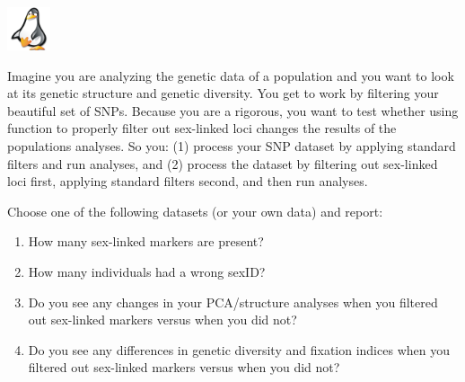 \documentclass[
  letterpaper,
  DIV=11,
  numbers=noendperiod]{scrreprt}
\let\textttOrig\texttt
\renewcommand{\texttt}[1]{\textttOrig{\color{blue}{#1}}}
\begin{document}

\begin{tcolorbox}[enhanced jigsaw, coltitle=black, colframe=quarto-callout-note-color-frame, colbacktitle=quarto-callout-note-color!10!white, breakable, bottomtitle=1mm, rightrule=.15mm, opacitybacktitle=0.6, left=2mm, arc=.35mm, opacityback=0, leftrule=.75mm, toptitle=1mm, titlerule=0mm, title=\textcolor{quarto-callout-note-color}{\faInfo}\hspace{0.5em}{Exercise}, bottomrule=.15mm, toprule=.15mm, colback=white]

\includegraphics[width=0.5in,height=0.5in]{images/task.png}

Imagine you are analyzing the genetic data of a population and you want
to look at its genetic structure and genetic diversity. You get to work
by filtering your beautiful set of SNPs. Because you are a rigorous, you
want to test whether using function \texttt{filter.sex.linked} to
properly filter out sex-linked loci changes the results of the
populations analyses. So you: (1) process your SNP dataset by applying
standard filters and run analyses, and (2) process the dataset by
filtering out sex-linked loci first, applying standard filters second,
and then run analyses.

Choose one of the following datasets (or your own data) and report:

\begin{enumerate}
\def\labelenumi{\arabic{enumi}.}
\item
  How many sex-linked markers are present?
\item
  How many individuals had a wrong sexID?
\item
  Do you see any changes in your PCA/structure analyses when you
  filtered out sex-linked markers versus when you did not?
\item
  Do you see any differences in genetic diversity and fixation indices
  when you filtered out sex-linked markers versus when you did not?
\end{enumerate}

\end{tcolorbox}
\end{document}
